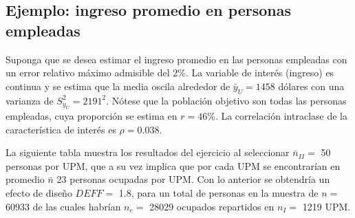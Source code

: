 \documentclass[12pt,spanish,]{book}
\begin{document}
\hypertarget{ejemplo-ingreso-promedio-en-personas-empleadas}{%
\subsection{Ejemplo: ingreso promedio en personas empleadas}\label{ejemplo-ingreso-promedio-en-personas-empleadas}}

Suponga que se desea estimar el ingreso promedio en las personas empleadas con un error relativo máximo admisible del 2\%. La variable de interés (ingreso) es continua y se estima que la media oscila alrededor de \(\bar{y}_U=1458\) dólares con una varianza de \(S^2_{y_U}=2191^2\). Nótese que la población objetivo son todas las personas empleadas, cuya proporción se estima en \(r = 46\)\%. La correlación intraclase de la característica de interés es \(\rho = 0.038\).

La siguiente tabla muestra los resultados del ejercicio al seleccionar \(\bar{n}_{II} =\) 50 personas por UPM, que a su vez implica que por cada UPM se encontrarían en promedio \(\bar{n}\) 23 personas ocupadas por UPM. Con lo anterior se obtendría un efecto de diseño \(DEFF =\) 1.8, para un total de personas en la muestra de \(n =\) 60933 de las cuales habrían \(n_e =\) 28029 ocupados repartidos en \(n_{I} =\) 1219 UPM.
\end{document}
